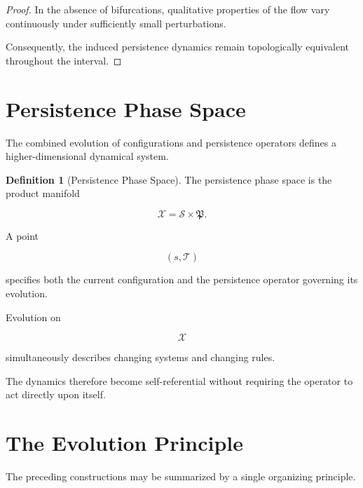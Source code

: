 \documentclass[11pt]{book}
\numberwithin{equation}{chapter}
\theoremstyle{definition}
\newtheorem{definition}{Definition}[chapter]
\theoremstyle{plain}
\begin{document}
\begin{proof}

In the absence of bifurcations, qualitative properties of the flow vary
continuously under sufficiently small perturbations.

Consequently, the induced persistence dynamics remain topologically
equivalent throughout the interval.

\end{proof}

\section{Persistence Phase Space}

The combined evolution of configurations and persistence operators
defines a higher-dimensional dynamical system.

\begin{definition}[Persistence Phase Space]

The persistence phase space is the product manifold

\[
\mathcal X
=
\mathcal S
\times
\mathfrak P.
\]

A point

\[
(s,\mathcal T)
\]

specifies both the current configuration and the persistence operator
governing its evolution.

\end{definition}

Evolution on

\[
\mathcal X
\]

simultaneously describes changing systems and changing rules.

The dynamics therefore become self-referential without requiring the
operator to act directly upon itself.

\section{The Evolution Principle}

The preceding constructions may be summarized by a single organizing
principle.
\end{document}
